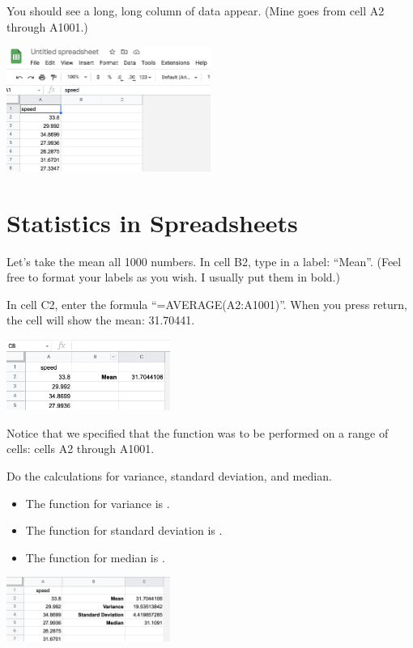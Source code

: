 You should see a long, long column of data appear. (Mine goes from cell A2 through A1001.)

\includegraphics[width=0.5\textwidth]{ImportedCSV.png}

\section{Statistics in Spreadsheets}

Let's take the mean all 1000 numbers.  In cell B2, type in a label:
``Mean''. (Feel free to format your labels as you wish. I usually put them in bold.)

In cell C2, enter the formula ``=AVERAGE(A2:A1001)''. When
you press return, the cell will show the mean: 31.70441.

\includegraphics[width=0.4\textwidth]{Spread_mean.png}

Notice that we specified that the function  was to
be performed on a range of cells: cells A2 through A1001.

Do the calculations for variance, standard deviation, and median.

\begin{itemize}
\item The function for variance is .
\item The function for standard deviation is .
\item The function for median is .
\end{itemize}

\includegraphics[width=0.4\textwidth]{var_stdev_median.png}

